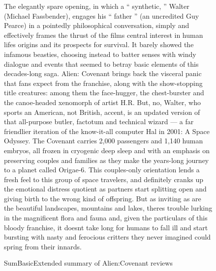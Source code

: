 \documentclass[../writeup.tex]{subfiles}
\begin{document}
\begin{figure}[h]
{        The elegantly spare opening, in which a “ synthetic, ” Walter (Michael Fassbender), engages his “ father ” (an uncredited Guy Pearce) in a pointedly philosophical conversation, simply and effectively frames the thrust of the films central interest in human lifes origins and its prospects for survival.
        It barely showed the infamous beasties, choosing instead to batter senses with windy dialogue and events that seemed to betray basic elements of this decades-long saga.
        Alien: Covenant brings back the visceral panic that fans expect from the franchise, along with the show-stopping title creatures: among them the face-hugger, the chest-burster and the canoe-headed xenomorph of artist H.R.
        But, no, Walter, who sports an American, not British, accent, is an updated version of that all-purpose butler, factotum and technical wizard — a far friendlier iteration of the know-it-all computer Hal in 2001: A Space Odyssey.
        The Covenant carries 2,000 passengers and 1,140 human embryos, all frozen in cryogenic deep sleep and with an emphasis on preserving couples and families as they make the years-long journey to a planet called Origae-6.
        This couples-only orientation lends a fresh feel to this group of space travelers, and definitely cranks up the emotional distress quotient as partners start splitting open and giving birth to the wrong kind of offspring.
        But as inviting as are the beautiful landscapes, mountains and lakes, theres trouble lurking in the magnificent flora and fauna and, given the particulars of this bloody franchise, it doesnt take long for humans to fall ill and start bursting with nasty and ferocious critters they never imagined could spring from their innards. }
    \caption{SumBasicExtended summary of Alien:Covenant reviews}
\end{figure}
\end{document}
